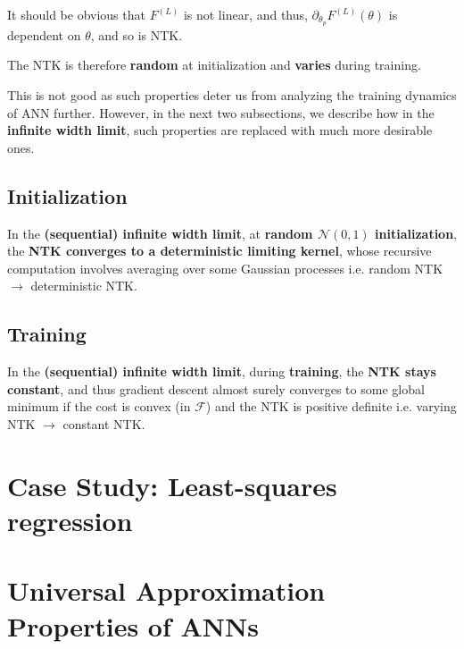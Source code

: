 \documentclass{article}
\theoremstyle{plain}
\theoremstyle{definition}
\theoremstyle{remark}
\begin{document}
It should be obvious that $F^{(L)}$ is not linear, and thus, $\partial_{\theta_p} F^{(L)}(\theta)$ is dependent on $\theta$, and so is NTK.

\begin{tcolorbox}
	The NTK is therefore {\bf random} at initialization and {\bf varies} during training.
\end{tcolorbox}

This is not good as such properties deter us from analyzing the training dynamics of ANN further.
However, in the next two subsections, we describe how in the {\bf infinite width limit}, such properties are replaced with much more desirable ones.

\subsection{Initialization}
\begin{tcolorbox}
	In the {\bf (sequential) infinite width limit}, at {\bf random $\mathcal{N}(0, 1)$ initialization}, the {\bf NTK converges to a deterministic limiting kernel}, whose recursive computation involves averaging over some Gaussian processes i.e. random NTK $\rightarrow$ deterministic NTK.
\end{tcolorbox}


\subsection{Training}
\begin{tcolorbox}
	In the {\bf (sequential) infinite width limit}, during {\bf training}, the {\bf NTK stays constant}, and thus gradient descent almost surely converges to some global minimum if the cost is convex (in $\mathcal{F}$) and the NTK is positive definite i.e. varying NTK $\rightarrow$ constant NTK.
\end{tcolorbox}




\section{Case Study: Least-squares regression}



\newpage



\appendix

\section{Universal Approximation Properties of ANNs}
\end{document}
